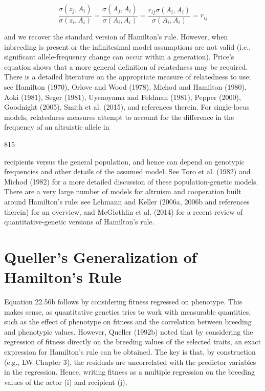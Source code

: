 \documentclass{article}
\begin{document}
\begin{equation}
\frac{\sigma(z_{j},A_{i})}{\sigma(z_{i},A_{i})}=\frac{\sigma(A_{j},A_{i})}{\sigma(A_{i},A_{i})}=\frac{r_{ij}\sigma(A_{i},A_{i})}{\sigma(A_{i},A_{i})}=r_{ij}
\end{equation}

and we recover the standard version of Hamilton's rule. However, when inbreeding is present or the infinitesimal model assumptions are not valid (i.e., significant allele-frequency change can occur within a generation), Price's equation shows that a more general definition of relatedness may be required. There is a detailed literature on the appropriate measure of relatedness to use; see Hamilton (1970), Orlove and Wood (1978), Michod and Hamilton (1980), Aoki (1981), Seger (1981), Uyenoyama and Feldman (1981), Pepper (2000), Goodnight (2005), Smith et al. (2015), and references therein. For single-locus models, relatedness measures attempt to account for the difference in the frequency of an altruistic allele in

815

recipients versus the general population, and hence can depend on genotypic frequencies and other details of the assumed model. See Toro et al. (1982) and Michod (1982) for a more detailed discussion of these population-genetic models. There are a very large number of models for altruism and cooperation built around Hamilton's rule; see Lehmann and Keller (2006a, 2006b and references therein) for an overview, and McGlothlin et al. (2014) for a recent review of quantitative-genetic versions of Hamilton's rule.

\section{Queller's Generalization of Hamilton's Rule}
Equation 22.56b follows by considering fitness regressed on phenotype. This makes sense, as quantitative genetics tries to work with measurable quantities, such as the effect of phenotype on fitness and the correlation between breeding and phenotypic values. However, Queller (1992b) noted that by considering the regression of fitness directly on the breeding values of the selected traits, an exact expression for Hamilton's rule can be obtained. The key is that, by construction (e.g., LW Chapter 3), the residuals are uncorrelated with the predictor variables in the regression. Hence, writing fitness as a multiple regression on the breeding values of the actor (i) and recipient (j),
\end{document}
